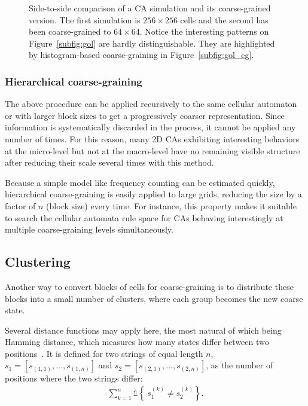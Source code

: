 \begin{figure}[th]
  \caption{\label{fig:gol_comparison} Side-to-side comparison of a CA simulation
    and its coarse-grained version. The first simulation is $256 \times 256$
    cells and the second has been coarse-grained to $64\times 64$. Notice the
    interesting patterns on Figure~\ref{subfig:gol} are hardly distinguishable.
    They are highlighted by histogram-based coarse-graining in
    Figure~\ref{subfig:gol_cg}.}
\end{figure}


\subsubsection{Hierarchical coarse-graining}
The above procedure can be applied recursively to the same cellular automaton or
with larger block sizes to get a progressively coarser representation. Since
information is systematically discarded in the process, it cannot be applied any
number of times. For this reason, many 2D CAs exhibiting interesting behaviors at
the micro-level but not at the macro-level have no remaining visible structure
after reducing their scale several times with this method.

Because a simple model like frequency counting can be estimated quickly,
hierarchical coarse-graining is easily applied to large grids, reducing the size
by a factor of $n$ (block size) every time. For instance, this property makes it
suitable to search the cellular automata rule space for CAs behaving
interestingly at multiple coarse-graining levels simultaneously.

\subsection{Clustering}

Another way to convert blocks of cells for coarse-graining is to distribute
these blocks into a small number of clusters, where each group becomes the new
coarse state.

Several distance functions may apply here, the most natural of which being
Hamming distance, which measures how many states differ between two
positions~\parencite{hammingErrorDetectingError1950}. It is defined for two strings
of equal length $n$, $s_1 = [s_{(1, 1)}, \ldots, s_{(1,n)}]$ and $s_2 =
[s_{(2,1)}, \ldots, s_{(2,n)}]$, as the number of positions where the two
strings differ:
\begin{align}
  \sum_{k = 1}^n \mathds{1}\left\{\ s_1^{(k)}  \neq s_2^{(k)}\right\}.
\end{align}

